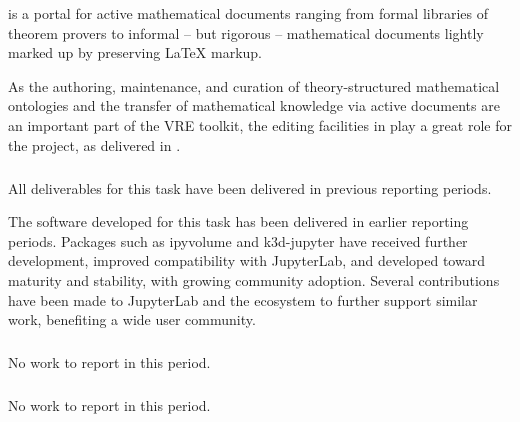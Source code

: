 \MathHub is a portal for active mathematical documents ranging from formal libraries of theorem provers to informal – but rigorous – mathematical documents lightly marked up by preserving LaTeX markup.

As the authoring, maintenance, and curation of theory-structured mathematical ontologies and the transfer of mathematical knowledge via active documents are an important part of the \ODK VRE toolkit, the editing facilities in \MathHub play a great role for the project,
as delivered in .

\subparagraph{}
\label{UI@vis3d}

All deliverables for this task have been delivered in previous reporting periods.

The software developed for this task has been delivered in earlier reporting periods.
Packages such as ipyvolume and k3d-jupyter have received further development,
improved compatibility with JupyterLab,
and developed toward maturity and stability,
with growing community adoption.
Several contributions have been made to JupyterLab and
the \Jupyter ecosystem to further support similar work,
benefiting a wide user community.

\subparagraph{} %
\label{UI@cfd-vis}

No work to report in this period.


\subparagraph{} %

No work to report in this period.

\subparagraph{} %
\label{UI@oommf-py-ipython-attributes}


